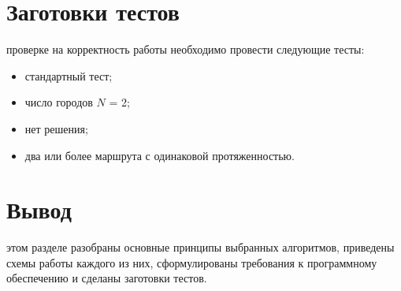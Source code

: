 \section{Заготовки тестов}
 проверке на корректность работы необходимо провести следующие тесты:
\begin{itemize}
	\item стандартный тест;
	\item число городов $N$ = 2;
	\item нет решения;
	\item два или более маршрута с одинаковой протяженностью.
\end{itemize}

\section*{Вывод}
 этом разделе разобраны основные принципы выбранных алгоритмов, приведены схемы работы каждого из них, сформулированы требования к программному обеспечению и сделаны заготовки тестов.




























